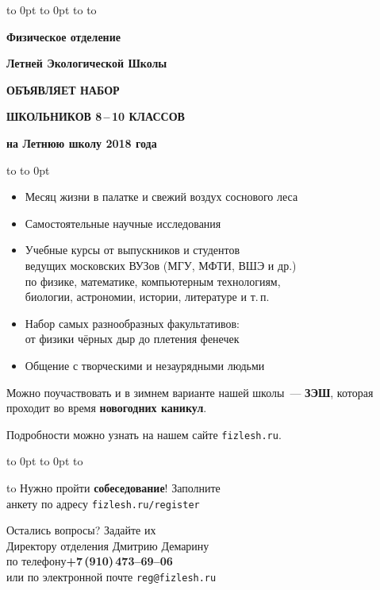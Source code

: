 \documentclass[a4paper,12pt]{article}
\begin{document}
\vbox to 0pt{%
\vbox to 0pt{\vskip9pt
\hbox to \vss}%
}%
\vskip28pt
\hbox to 
\vskip 34pt
\centerline{\Large\textbf{Физическое отделение}}
\vskip 10pt
\centerline{\Large\textbf{Летней Экологической Школы}}
\vskip15pt
\centerline{\huge\textsf{\textbf{ОБЪЯВЛЯЕТ НАБОР}}}
\vskip 15pt
\centerline{\huge\textsf{\textbf{ШКОЛЬНИКОВ 8\,--\,10 КЛАССОВ}}}
\vskip 10pt
\centerline{\Large\textbf{на
Летнюю школу {\Huge 2018} года}}
\vskip24pt
\hbox to 
\vskip-24pt\hbox to 0pt{}

{\Large%
\begin{itemize}
\setlength{\itemsep}{-4pt}
\setlength{\parindent}{0pt}
\item Месяц жизни в палатке и свежий воздух соснового леса
\item Самостоятельные научные исследования
\item Учебные курсы от выпускников и студентов\\ведущих московских ВУЗов (МГУ, МФТИ, ВШЭ и др.)\\
по физике, математике, компьютерным технологиям,\\
биологии, астрономии, истории, литературе и т.\,п.
\item Набор самых разнообразных факультативов:\\от физики чёрных дыр до плетения фенечек
\item Общение с творческими и незаурядными людьми
\end{itemize}

Можно поучаствовать и в зимнем варианте нашей школы~--- \textbf{ЗЭШ},
которая проходит во время \textbf{новогодних каникул}.

\vskip 12pt

Подробности можно узнать на нашем сайте {\huge\texttt{fizlesh.ru}}.

\vskip-20pt

\vbox to 0pt{%
\vbox to 0pt{%
\vskip15mm
\hbox to \vss}%
}%

\hbox to 
\vskip3pt
Нужно пройти \textbf{собеседование}! Заполните\\анкету
по адресу {\Large\texttt{fizlesh.ru/register}}

\vskip3pt
Остались вопросы? Задайте их\\
Директору отделения Дмитрию Демарину\\
по телефону\textbf{+7\,(910)\,473--69--06}\\
или по электронной почте \texttt{reg@fizlesh.ru}
}%
\end{document}
